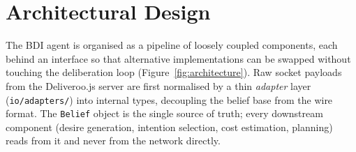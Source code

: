 \section{Architectural Design}
\label{sec:architecture}

The BDI agent is organised as a pipeline of loosely coupled components, each behind an interface
so that alternative implementations can be swapped without touching the deliberation loop
(Figure~\ref{fig:architecture}). Raw socket payloads from the Deliveroo.js server are first
normalised by a thin \emph{adapter} layer (\texttt{io/adapters/}) into internal types, decoupling
the belief base from the wire format. The \texttt{Belief} object is the single source of truth;
every downstream component (desire generation, intention selection, cost estimation, planning)
reads from it and never from the network directly.

